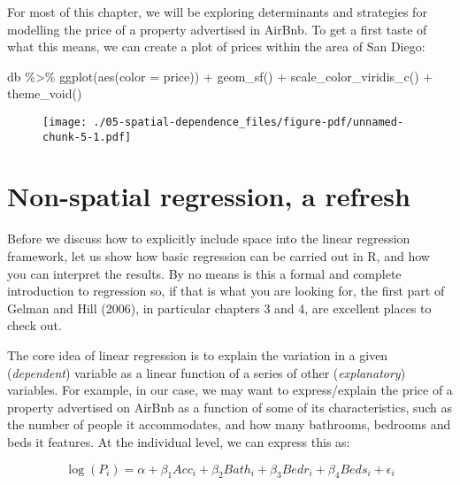 \documentclass[
  letterpaper,
  krantz2]{style/krantz}
\newenvironment{Shaded}{\begin{snugshade}}{\end{snugshade}}
\newcommand{\AttributeTok}[1]{\textcolor[rgb]{0.40,0.45,0.13}{#1}}
\newcommand{\FunctionTok}[1]{\textcolor[rgb]{0.28,0.35,0.67}{#1}}
\newcommand{\NormalTok}[1]{\textcolor[rgb]{0.00,0.23,0.31}{#1}}
\newcommand{\SpecialCharTok}[1]{\textcolor[rgb]{0.37,0.37,0.37}{#1}}
\begin{document}
For most of this chapter, we will be exploring determinants and
strategies for modelling the price of a property advertised in AirBnb.
To get a first taste of what this means, we can create a plot of prices
within the area of San Diego:

\begin{Shaded}
\begin{Highlighting}[]
\NormalTok{db }\SpecialCharTok{\%\textgreater{}\%}
  \FunctionTok{ggplot}\NormalTok{(}\FunctionTok{aes}\NormalTok{(}\AttributeTok{color =}\NormalTok{ price)) }\SpecialCharTok{+}
  \FunctionTok{geom\_sf}\NormalTok{() }\SpecialCharTok{+} 
  \FunctionTok{scale\_color\_viridis\_c}\NormalTok{() }\SpecialCharTok{+}
  \FunctionTok{theme\_void}\NormalTok{()}
\end{Highlighting}
\end{Shaded}

\begin{figure}[H]

{\centering \texttt{[image: ./05-spatial-dependence\_files/figure-pdf/unnamed-chunk-5-1.pdf]}

}

\end{figure}

\hypertarget{non-spatial-regression-a-refresh}{%
\section{Non-spatial regression, a
refresh}\label{non-spatial-regression-a-refresh}}

Before we discuss how to explicitly include space into the linear
regression framework, let us show how basic regression can be carried
out in R, and how you can interpret the results. By no means is this a
formal and complete introduction to regression so, if that is what you
are looking for, the first part of Gelman and Hill (2006), in particular
chapters 3 and 4, are excellent places to check out.

The core idea of linear regression is to explain the variation in a
given (\emph{dependent}) variable as a linear function of a series of
other (\emph{explanatory}) variables. For example, in our case, we may
want to express/explain the price of a property advertised on AirBnb as
a function of some of its characteristics, such as the number of people
it accommodates, and how many bathrooms, bedrooms and beds it features.
At the individual level, we can express this as:

\[
\log(P_i) = \alpha + \beta_1 Acc_i + \beta_2 Bath_i + \beta_3 Bedr_i + \beta_4 Beds_i + \epsilon_i
\]
\end{document}
